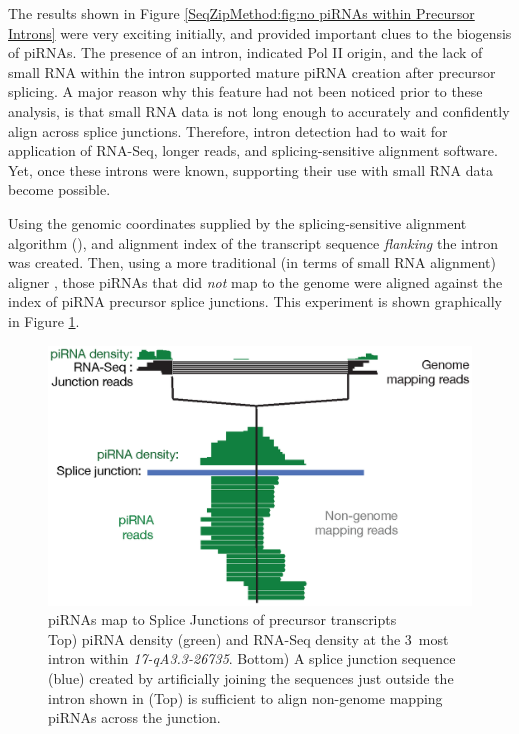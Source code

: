   The results shown in Figure \ref{SeqZipMethod:fig:no piRNAs within Precursor Introns} were very exciting initially, and provided important clues to the biogensis of piRNAs. The presence of an intron, indicated Pol II origin, and the lack of small RNA within the intron supported mature piRNA creation after precursor splicing. A major reason why this feature had not been noticed prior to these analysis, is that small RNA data is not long enough to accurately and confidently align across splice junctions. Therefore, intron detection had to wait for application of RNA-Seq, longer reads, and splicing-sensitive alignment software. Yet, once these introns were known, supporting their use with small RNA data become possible.

  Using the genomic coordinates supplied by the splicing-sensitive alignment algorithm (\citep{Trapnell2009}), and alignment index of the transcript sequence \textit{flanking} the intron was created. Then, using a more traditional (in terms of small RNA alignment) aligner \citep{Langmead2009}, those piRNAs that did \textit{not} map to the genome were aligned against the index of piRNA precursor splice junctions. This experiment is shown graphically in Figure \ref{SeqZipMethod:fig: piRNAs map to SJ}.

  \begin{figure} %
    \centering 
    \includegraphics{Figures/SeqZipMethod/smallRNAsMapToPrecursorSJ.eps}
    \caption[piRNAs map to Splice Junctions of precursor transcripts]
    {
      piRNAs map to Splice Junctions of precursor transcripts\\[0.25cm]
      Top) piRNA density (green) and RNA-Seq density at the 3\textprime~most intron within \textit{17-qA3.3-26735}. Bottom) A splice junction sequence (blue) created by artificially joining the sequences just outside the intron shown in (Top) is sufficient to align non-genome mapping piRNAs across the junction.
      }
    \label{SeqZipMethod:fig: piRNAs map to SJ}
    \end{figure}

